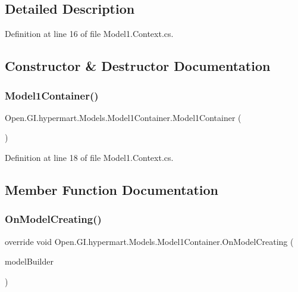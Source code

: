\subsection{Detailed Description}


Definition at line 16 of file Model1.\+Context.\+cs.



\subsection{Constructor \& Destructor Documentation}
\mbox{\label{class_open_1_1_g_i_1_1hypermart_1_1_models_1_1_model1_container_a8d957335d29c47427c9d9062c11e6205}} 
\subsubsection{Model1\+Container()}
{\footnotesize\ttfamily Open.\+G\+I.\+hypermart.\+Models.\+Model1\+Container.\+Model1\+Container (\begin{DoxyParamCaption}{ }\end{DoxyParamCaption})}



Definition at line 18 of file Model1.\+Context.\+cs.



\subsection{Member Function Documentation}
\mbox{\label{class_open_1_1_g_i_1_1hypermart_1_1_models_1_1_model1_container_a738eaf983c5fc89665bff3d90f9fb188}} 
\subsubsection{On\+Model\+Creating()}
{\footnotesize\ttfamily override void Open.\+G\+I.\+hypermart.\+Models.\+Model1\+Container.\+On\+Model\+Creating (\begin{DoxyParamCaption}\item[{Db\+Model\+Builder}]{model\+Builder }\end{DoxyParamCaption})\hspace{0.3cm}{\ttfamily [protected]}}



